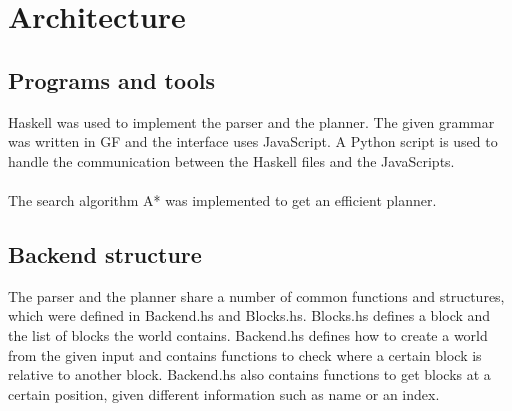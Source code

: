 \chapter{Architecture}

\section{Programs and tools}
Haskell was used to implement the parser and the planner. The given grammar was written in GF and the interface uses JavaScript. A Python script is used to handle the communication between the Haskell files and the JavaScripts.\\\\
The search algorithm A* was implemented to get an efficient planner.

\section{Backend structure}
The parser and the planner share a number of common functions and structures, which were defined in Backend.hs and Blocks.hs. Blocks.hs defines a block and the list of blocks the world contains. Backend.hs defines how to create a world from the given input and contains functions to check where a certain block is relative to another block. Backend.hs also contains functions to get blocks at a certain position, given different information such as name or an index. 

